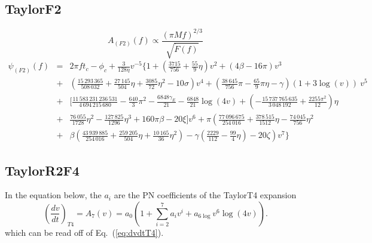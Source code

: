 \subsection{TaylorF2}
\label{app:F2}

\begin{equation}
A_{(F2)}(f) \propto \frac{\left(\pi M f\right)^{2/3}}{\sqrt{\dot{F}(f)}}  
\end{equation} \begin{eqnarray}
\psi_{(F2)}(f) &=& 2\pi f t_c - \phi_c + \frac{3}{128\eta} v^{-5} \Bigg\{
1
+ \left( \frac{3715}{756} + \frac{55}{9} \eta \right) v^2 
+ ( 4 \beta - 16\pi ) v^3 \nonumber\\
&+& \left( \frac{15\,293\,365}{508\,032} + \frac{27\,145}{504} \eta + \frac{3085}{72} \eta^2 - 10\sigma \right) v^4
+ \left( \frac{38\,645}{756} \pi - \frac{65}{9}\pi\eta - \gamma \right) (1+3\log(v)) ~ v^5\nonumber\\
&+& \Bigg[ \frac{11\,583\,231\,236\,531}{4\,694\,215\,680} - \frac{640}{3}\pi^2 -\frac{6848\gamma_E}{21} -\frac{6848}{21} \log(4v)
+ \left( - \frac{15\,737\,765\,635}{3\,048\,192} + \frac{2255\pi^2}{12} \right) \eta \nonumber\\
&+& \frac{76\,055}{1728} \eta^2 - \frac{127\,825}{1296} \eta^3 + 160 \pi \beta - 20 \xi \Bigg] v^6 + \pi \left( \frac{77\,096\,675}{254\,016} + \frac{378\,515}{1512}\eta - \frac{74\,045}{756}\eta^2 
\right. \nonumber\\
 &+& \left. \beta \left( \frac{43\,939\,885}{254\,016} + \frac{259\,205}{504}\eta + \frac{10\,165}{36}\eta^2 \right) 
 - \gamma \left( \frac{2229}{112} - \frac{99}{4}\eta \right) - 20 \zeta \right) v^7  \Bigg\}
\end{eqnarray}



\subsection{TaylorR2F4}
\label{app:R2F4}

In the equation below, the $a_i$ are the PN coefficients of the TaylorT4 expansion 
\begin{equation}
\left(\frac{dv}{dt}\right)_{T4} = A_7(v) = a_0 \left( 1 + \sum_{i=2}^7 a_i v^i + a_{6\log} v^6 \log(4 v)\right) . \nonumber
\end{equation}
which can be read off of Eq.~(\ref{eq:dvdtT4}).

